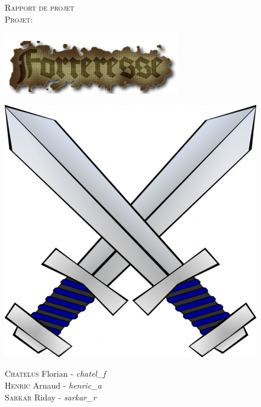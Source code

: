 \documentclass[a4paper, 12pt]{article}
\begin{document}
\begin{titlepage}
  \begin{sffamily}
  \begin{center}


    \textsc{\Huge Rapport de projet}\\[3cm]

    \textsc{\LARGE Projet:}\\[1.5cm]

	\centerline{\includegraphics{coollogo_com-19602433.png}}
	\vfill{
	\centerline{\includegraphics[scale=0.4]{crossed-swords-clip-art-48219.jpg}}}

    \begin{minipage}{0.4\textwidth}
      \begin{flushleft} \large	
      
      \end{flushleft}
    \end{minipage}
	\begin{flushleft}\vfill
      {
       \textsc{Chatelus} Florian - \emph{chatel\_f} \\
       \textsc{Henric} Arnaud - \emph{henric\_a}\\
       \textsc{Sarkar} Riday - \emph{sarkar\_r}\\
       }
    \end{flushleft}	
  \end{center}
  \end{sffamily}
\end{titlepage}
\end{document}
